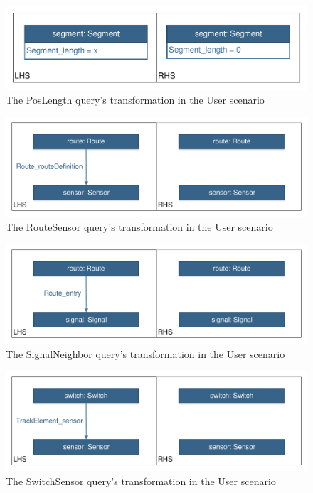 \begin{figure}[h]
	\centering
	\includegraphics[scale=0.4]{figures/trainbenchmark-transformation-user-poslength}
	\caption{The PosLength query's transformation in the User scenario}
	\label{fig:trainbenchmark-transformation-user-poslength}
\end{figure}

\begin{figure}[h]
	\centering
	\includegraphics[scale=0.4]{figures/trainbenchmark-transformation-user-routesensor}
	\caption{The RouteSensor query's transformation in the User scenario}
	\label{fig:trainbenchmark-transformation-user-routesensor}
\end{figure}

\begin{figure}[h]
	\centering
	\includegraphics[scale=0.4]{figures/trainbenchmark-transformation-user-signalneighbor}
	\caption{The SignalNeighbor query's transformation in the User scenario}
	\label{fig:trainbenchmark-transformation-user-signalneighbor}
\end{figure}

\begin{figure}[h]
	\centering
	\includegraphics[scale=0.4]{figures/trainbenchmark-transformation-user-switchsensor}
	\caption{The SwitchSensor query's transformation in the User scenario}
	\label{fig:trainbenchmark-transformation-user-switchsensor}
\end{figure}



